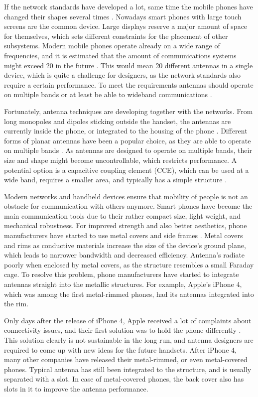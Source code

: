 If the network standards have developed a lot, same time the mobile phones have changed their shapes several times \cite{anguera2}. Nowadays smart phones with large touch screens are the common device. Large displays reserve a major amount of space for themselves, which sets different constraints for the placement of other subsystems. Modern mobile phones operate already on a wide range of frequencies, and it is estimated that the amount of communications systems might exceed 20 in the future \cite{20ant}. This would mean 20 different antennas in a single device, which is quite a challenge for designers, as the network standards also require a certain performance. To meet the requirements antennas should operate on multiple bands or at least be able to wideband communications \cite{lehtovuori_wideband_match}.

Fortunately, antenna techniques are developing together with the networks. From long monopoles and dipoles sticking outside the handset, the antennas are currently inside the phone, or integrated to the housing of the phone \cite{saunders,molisch}. Different forms of planar antennas have been a popular choice, as they are able to operate on multiple bands \cite{anguera}. As antennas are designed to operate on multiple bands, their size and shape might become uncontrollable, which restricts performance. A potential option is a capacitive coupling element (CCE), which can be used at a wide band, requires a smaller area, and typically has a simple structure \cite{valkonen_cce2}.

Modern networks and handheld devices ensure that mobility of people is not an obstacle for communication with others anymore. Smart phones have become the main communication tools due to their rather compact size, light weight, and mechanical robustness. For improved strength and also better aesthetics, phone manufacturers have started to use metal covers and side frames \cite{rowell}. Metal covers and rims as conductive materials increase the size of the device's ground plane, which leads to narrower bandwidth and decreased efficiency. Antenna's radiate poorly when enclosed by metal covers, as the structure resembles a small Faraday cage. To resolve this problem, phone manufacturers have started to integrate antennas straight into the metallic structures. For example, Apple's iPhone 4, which was among the first metal-rimmed phones, had its antennas integrated into the rim. 

Only days after the release of iPhone 4, Apple received a lot of complaints about connectivity issues, and their first solution was to hold the phone differently \cite{apple_press,apple_bbc}. This solution clearly is not sustainable in the long run, and antenna designers are required to come up with new ideas for the future handsets. After iPhone 4, many other companies have released their metal-rimmed, or even metal-covered phones. Typical antenna has still been integrated to the structure, and is usually separated with a slot. In case of metal-covered phones, the back cover also has slots in it to improve the antenna performance. 

